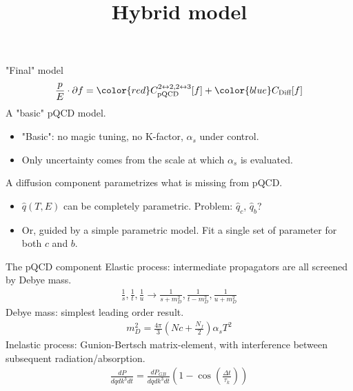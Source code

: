 \documentclass[11pt]{beamer}
\title{Hybrid model}
\begin{document}
\begin{frame}
\titlepage
\end{frame}


\begin{frame}{"Final" model}
\begin{eqnarray}
\nonumber
\frac{p}{E}\cdot \partial f = {\color{red} C^{2\leftrightarrow 2, 2\leftrightarrow 3}_{\textrm{pQCD}}[f]} + {\color{blue} C_{\textrm{Diff}}[f]}
\end{eqnarray}
{\color{red} A "basic" pQCD model.}
\begin{itemize}
\item "Basic": no magic tuning, no K-factor, $\alpha_s$ under control.
\item Only uncertainty comes from the scale at which $\alpha_s$ is evaluated.
\end{itemize}
{\color{blue} A diffusion component parametrizes what is missing from pQCD.}
\begin{itemize}
\item $\hat{q}(T, E)$ can be completely parametric. Problem: $\hat{q}_c$, $\hat{q}_b$?
\item Or, guided by a simple parametric model. Fit a single set of parameter for both $c$ and $b$.
\end{itemize}
\end{frame}

\begin{frame}{The pQCD component}
Elastic process: intermediate propagators are all screened by Debye mass.
\begin{eqnarray}
\nonumber
\frac{1}{s}, \frac{1}{t}, \frac{1}{u} \rightarrow \frac{1}{s+m_D^2}, \frac{1}{t-m_D^2}, \frac{1}{u+m_D^2}
\end{eqnarray}
Debye mass: simplest leading order result.
\begin{eqnarray}
\nonumber
m_D^2 = \frac{4\pi}{3}\left(Nc+\frac{N_f}{2}\right)\alpha_s T^2
\end{eqnarray}
Inelastic process: Gunion-Bertsch matrix-element, with interference between subsequent radiation/absorption.
\begin{eqnarray}
\nonumber
\frac{dP}{dq dk^3 dt} = \frac{dP_{GB}}{dq dk^3 dt} \left(1-\cos\left(\frac{\Delta t}{\tau_k}\right)\right)
\end{eqnarray}
\end{frame}
\end{document}
